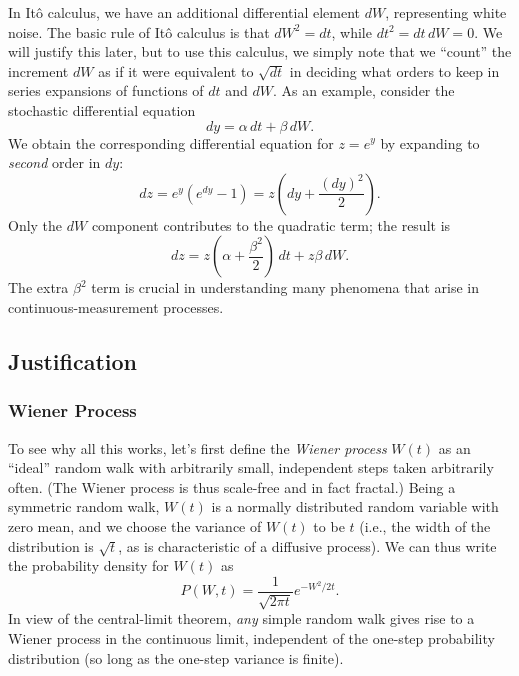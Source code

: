 \documentclass[12pt,aps,onecolum,superscriptaddress,footinbib,floatfix,showpacs]{revtex4-1}
\begin{document}
In It\^o calculus, we have an additional differential element $dW$,
representing white noise.  The basic rule of It\^o calculus is
that $dW^2=dt$, while $dt^2=dt\,dW = 0$.  We will justify this
later, but to use this calculus, we simply note that we ``count''
the increment $dW$ as if it were equivalent to $\sqrt{dt}$ in
deciding what orders to keep in series expansions
of functions of $dt$ and $dW$.
As an example, consider the stochastic differential equation
\begin{equation}
  dy = \alpha\,dt+\beta\,dW.
  \label{exampley}
\end{equation}
We obtain the corresponding differential equation for $z=e^y$
by expanding to \textit{second} order in $dy$:
\begin{equation}
  dz = e^y\left(e^{dy}-1\right) = z\left(dy+\frac{(dy)^2}{2}\right).
\end{equation}
Only the $dW$ component contributes to the quadratic term; the
result is
\begin{equation}
  dz = z\left(\alpha+ \frac{\beta^2}{2}\right)\,dt + z\beta\,dW.
\end{equation}
The extra $\beta^2$ term is crucial in understanding many phenomena
that arise in continuous-measurement processes.


\subsection{Justification}

\subsubsection{Wiener Process}\label{section:wienerprocess}
To see why all this works, let's first define the \textit{Wiener process}
$W(t)$ as an ``ideal'' random walk with arbitrarily small, independent 
steps taken arbitrarily often.  (The Wiener process is thus
scale-free and in fact fractal.)  Being a symmetric random walk, $W(t)$ is 
a normally distributed random variable with zero mean, 
and we choose
the variance of $W(t)$ to be $t$ (i.e., the width of the 
distribution is $\sqrt{t}$, as is characteristic of a diffusive process).
We can thus write the probability density for $W(t)$ as
\begin{equation}
  P(W,t) = \frac{1}{\sqrt{2\pi t}} e^{-W^2/2t}.
  \label{gaussprobW}
\end{equation}
In view of the central-limit theorem, \textit{any} simple random
walk gives rise to a Wiener process in the continuous limit, independent
of the one-step probability distribution (so long as the one-step
variance is finite).
\end{document}
